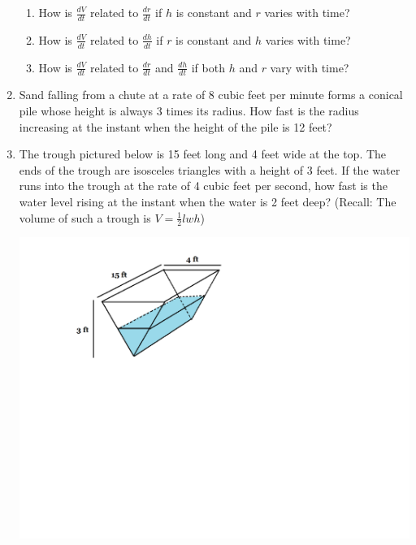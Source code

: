 \documentclass[12pt]{article}
\newif\ifans
\begin{document}
\begin{enumerate}
\begin{enumerate}

\item How is $\frac{dV}{dt}$ related to $\frac{dr}{dt}$ if $h$ is constant and $r$ varies with time?

\ifans{\fbox{$\frac{dV}{dt}=2\pi r h \frac{dr}{dt}$}} \fi

\item How is $\frac{dV}{dt}$ related to $\frac{dh}{dt}$ if $r$ is constant and $h$ varies with time?

\ifans{\fbox{$\frac{dV}{dt}=\pi r^2 \frac{dh}{dt}$}} \fi

\item How is $\frac{dV}{dt}$ related to $\frac{dr}{dt}$ and $\frac{dh}{dt}$ if both $h$ and $r$ vary with time?

\ifans{\fbox{$\frac{dV}{dt}=\pi\left(r^2 \frac{dh}{dt}+2rh \frac{dr}{dt}\right)$}} \fi

\end{enumerate}

\newpage

\item Sand falling from a chute at a rate of 8 cubic feet per minute forms a conical pile whose height is always 3 times its radius.  How fast is the radius increasing at the instant when the height of the pile is 12 feet? 

\ifans{\fbox{$\frac{1}{6\pi}$ ft per min}} \fi

\item The trough pictured below is 15 feet long and 4 feet wide at the top.  The ends of the trough are isosceles triangles with a height of 3 feet.  If the water runs into the trough at the rate of 4 cubic feet per second, how fast is the water level rising at the instant when the water is 2 feet deep? (Recall: The volume of such a trough is $V=\frac{1}{2}lwh$)
\begin{center}
\includegraphics[scale=0.60]{trough.pdf}
\end{center}
\ifans{\fbox{$\frac{1}{10}$ feet per second}} \fi


\end{enumerate}
\end{document}
